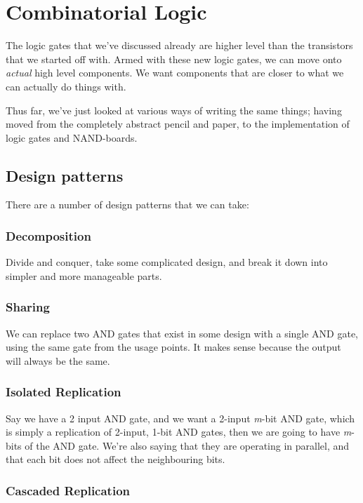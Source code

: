 \documentclass[11pt,a4paper,titlepage,dvipsnames,cmyk]{scrartcl}
\begin{document}
\section{Combinatorial Logic}%
\label{sec:combinatorial}

The logic gates that we've discussed already are higher level than the
transistors that we started off with. Armed with these new logic gates, we
can move onto \textit{actual} high level components. We want components
that are closer to what we can actually do things with.

Thus far, we've just looked at various ways of writing the same things;
having moved from the completely abstract pencil and paper, to the
implementation of logic gates and NAND-boards.

\subsection{Design patterns}%
\label{sub:patterns}
There are a number of design patterns that we can take:

\subsubsection{Decomposition}%
\label{ssub:Decomposition}

Divide and conquer, take some complicated design, and break it down into
simpler and more manageable parts.

\subsubsection{Sharing}%
\label{ssub:Sharing}

We can replace two AND gates that exist in some design with a single AND
gate, using the same gate from the usage points.  It makes sense because
the output will always be the same.

\subsubsection{Isolated Replication}%
\label{ssub:isolated}

Say we have a 2 input AND gate, and we want a 2-input \textit{m}-bit AND
gate, which is simply a replication of 2-input, 1-bit AND gates, then we
are going to have \textit{m}-bits of the AND gate. We're also saying that
they are operating in parallel, and that each bit does not affect the
neighbouring bits.

\subsubsection{Cascaded Replication}%
\label{ssub:cascaded}
\end{document}
